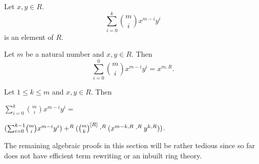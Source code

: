 \documentclass[11pt]{article}
\begin{document}
\newcommand{\binsum}[5]{{\sum}_{i = 0}^{{#1}} {#2 \choose i} #3^{#2 - i} #4^{i}}

\begin{forthel}

\begin{signature} Let $x,y \in R$.
\[\binsum{k}{m}{x}{y}{R}\] is an element of $R$.
\end{signature}

\begin{axiom} Let $m$ be a natural number and $x,y \in R$.
Then 
\[\binsum{0}{m}{x}{y}{R} = x^{m,R}.\]
\end{axiom}

\begin{axiom}[id = Summation recursion, title = Summation recursion]
Let $1 \leq k \leq m$ and $x,y \in R$. 
Then 

$\binsum{k}{m}{x}{y}{R} = $

$(\binsum{k-1}{m}{x}{y}{R}) +^{R} 
(\cho{m}{k}^{[R]} \cdot^{R} (x^{m - k,R} \cdot^{R} y^{k,R}))$. 
\end{axiom}
\end{forthel}
The remaining algebraic proofs in this section will be rather tedious since 
\Naproche so far does not have efficient term rewriting or an inbuilt ring theory.
\end{document}
